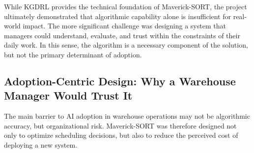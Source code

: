 While KGDRL provides the technical foundation of Maverick-SORT, the project ultimately demonstrated that algorithmic capability alone is insufficient for real-world impact. The more significant challenge was designing a system that managers could understand, evaluate, and trust within the constraints of their daily work. In this sense, the algorithm is a necessary component of the solution, but not the primary determinant of adoption.




\subsection{Adoption-Centric Design: Why a Warehouse Manager Would Trust It}

The main barrier to AI adoption in warehouse operations may not be algorithmic accuracy, but organizational risk. Maverick-SORT was therefore designed not only to optimize scheduling decisions, but also to reduce the perceived cost of deploying a new system.

